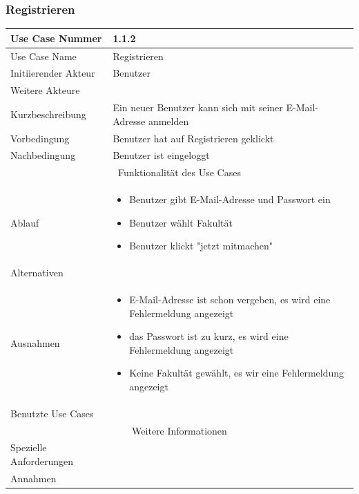 \documentclass[10pt,a4paper]{article}
\begin{document}
\subsubsection{Registrieren}
	\begin{tabular}{|l|p{.5\linewidth}|}
	\hline Use Case Nummer & 1.1.2 \\ 
	\hline Use Case Name & Registrieren \\ 
	\hline Initiierender Akteur & Benutzer \\
	\hline Weitere Akteure &  \\
	\hline Kurzbeschreibung & Ein neuer Benutzer kann sich mit seiner E-Mail-Adresse anmelden \\
	\hline Vorbedingung & Benutzer hat auf Registrieren geklickt \\
	\hline Nachbedingung & Benutzer ist eingeloggt \\
	\hline \multicolumn{2}{|c|}{Funktionalität des Use Cases}\\
	\hline Ablauf & \begin{itemize}
		\item Benutzer gibt E-Mail-Adresse und Passwort ein
		\item Benutzer w\"ahlt Fakult\"at
		\item Benutzer klickt "jetzt mitmachen"
	\end{itemize} \\
	\hline Alternativen &  \\
	\hline Ausnahmen & \begin{itemize}
		\item E-Mail-Adresse ist schon vergeben, es wird eine Fehlermeldung angezeigt
		\item das Passwort ist zu kurz, es wird eine Fehlermeldung angezeigt
		\item Keine Fakult\"at gewählt, es wir eine Fehlermeldung angezeigt
	\end{itemize} \\
	\hline Benutzte Use Cases &  \\
	\hline \multicolumn{2}{|c|}{Weitere Informationen} \\
	\hline Spezielle Anforderungen &  \\
	\hline Annahmen &  \\
	\hline
	\end{tabular} 
		
\end{document}
